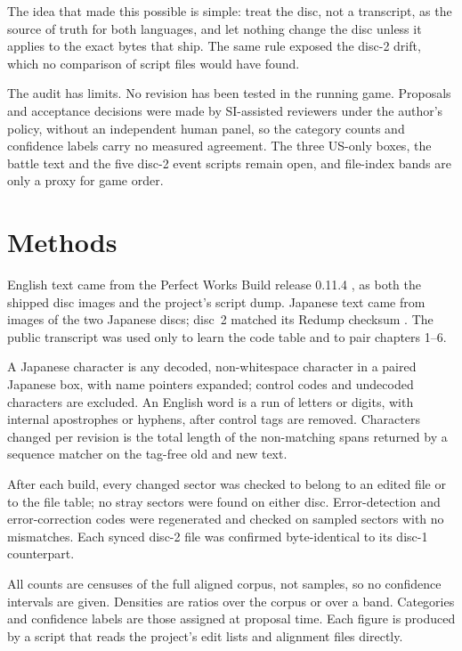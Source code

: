 \documentclass[11pt]{article}
\begin{document}
The idea that made this possible is simple: treat the disc, not a
transcript, as the source of truth for both languages, and let nothing
change the disc unless it applies to the exact bytes that ship. The same
rule exposed the disc-2 drift, which no comparison of script files would
have found.

The audit has limits. No revision has been tested in the running game.
Proposals and acceptance decisions were made by SI-assisted reviewers
under the author's policy, without an independent human panel, so the
category counts and confidence labels carry no measured agreement. The
three US-only boxes, the battle text and the five disc-2 event scripts
remain open, and file-index bands are only a proxy for game order.

\section{Methods}

 English text came from the Perfect Works Build
release 0.11.4 \citep{pwbuild}, as both the shipped disc images and the
project's script dump. Japanese text came from images of the two
Japanese discs; disc~2 matched its Redump checksum \citep{redump}. The
public transcript \citep{xgus} was used only to learn the code table and
to pair chapters 1--6.

 A Japanese character is any decoded,
non-whitespace character in a paired Japanese box, with name pointers
expanded; control codes and undecoded characters are excluded. An
English word is a run of letters or digits, with internal apostrophes or
hyphens, after control tags are removed. Characters changed per revision
is the total length of the non-matching spans returned by a sequence
matcher on the tag-free old and new text.

 After each build, every changed sector was
checked to belong to an edited file or to the file table; no stray
sectors were found on either disc. Error-detection and error-correction
codes were regenerated and checked on sampled sectors with no
mismatches. Each synced disc-2 file was confirmed byte-identical to its
disc-1 counterpart.

 All counts are censuses of the full
aligned corpus, not samples, so no confidence intervals are given.
Densities are ratios over the corpus or over a band. Categories and
confidence labels are those assigned at proposal time. Each figure is
produced by a script that reads the project's edit lists and alignment
files directly.
\end{document}

